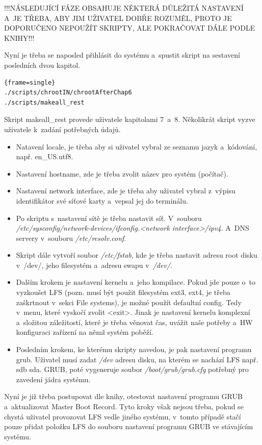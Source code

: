 \documentclass[a4paper,12pt]{article}
\newenvironment{codeframe}{%
  \begin{Sbox} 
    \begin{minipage} 
      {\columnwidth-\leftmargin-\rightmargin-2\fboxsep-2\fboxrule-4pt} 
}{%

  \end{minipage} 
  \end{Sbox} 
  \begin{center} 
    \fcolorbox{black}{codeback}{\TheSbox} 
  \end{center} 
}
\begin{document}
!!!NÁSLEDUJÍCÍ FÁZE OBSAHUJE NĚKTERÁ DŮLEŽITÁ NASTAVENÍ A~JE TŘEBA, ABY JIM UŽIVATEL DOBŘE ROZUMĚL, PROTO JE DOPORUČENO NEPOUŽÍT SKRIPTY, ALE POKRAČOVAT DÁLE PODLE KNIHY!!!

Nyní je třeba se naposled přihlásit do systému a~spustit skript na sestavení posledních dvou kapitol.
    \begin{codeframe} 
\begin{Verbatim}{frame=single}
./scripts/chrootIN/chrootAfterChap6
./scripts/makeall_rest
\end{Verbatim} 
    \end{codeframe}
Skript makeall\_rest provede uživatele kapitolami 7~a~8. Několikrát skript vyzve uživatele k~zadání potřebných údajů.
\begin{itemize}
 \item Natavení locale, je třeba aby si uživatel vybral ze seznamu jazyk a~kódování, např. en\_US.utf8.
 \item Nastavení hostname, zde je třeba zvolit název pro systém (počítač).
 \item Nastavení network interface, zde je třeba aby uživatel vybral z~výpisu identifikátor své síťové karty a~vepsal jej do terminálu.
 \item Po skriptu s~nastavení sítě je třeba nastavit síť. V~souboru \textit{/etc/sysconfig/network-devices/ifconfig.<network interface>/ipv4}. A~DNS servery v~souboru \textit{/etc/resolv.conf}.
 \item Skript dále vytvoří soubor \textit{/etc/fstab}, kde je třeba nastavit adresu root disku v~/dev/, jeho filesystém a~adresu swapu v~\textit{/dev/}.
 \item Dalším krokem je nastavení kernelu a~jeho kompilace. Pokud jde pouze o~to vyzkoušet LFS (pozn. musí být použit filesystém ext3, ext4, je třeba zaškrtnout v~sekci File systems), je možné použít defaultní config. Tedy v~menu, které vyskočí zvolit <exit>. Jinak je nastavení kernelu komplexní a~složitou záležitostí, které je třeba věnovat čas, uvážit naše potřeby a~HW konfiguraci zařízení na němž systém poběží.
 \item Posledním krokem, ke kterému skripty navedou, je pak nastavení programu grub. Uživatel musí zadat \textit{/dev} adresu disku, na kterém se nachází LFS např. sdb sda. GRUB, poté vygeneruje soubor \textit{/boot/grub/grub.cfg} potřebný pro zavedení jádra systému.
\end{itemize}

Nyní je již třeba postupovat dle knihy, otestovat nastavení programu GRUB a~aktualizovat Master Boot Record. Tyto kroky však nejsou třeba, pokud se chystá uživatel provozovat LFS vedle jiného systému, v~tomto případě stačí pouze přidat položku LFS do souboru nastavení programu GRUB ve stávajícím systému.
\end{document}
